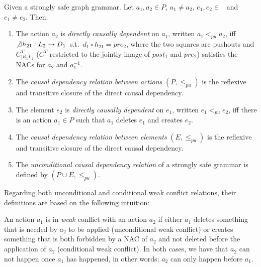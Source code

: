 \begin{definition} Given \doublyTypedGraphGrammarCore{} a strongly safe graph grammar. Let $a_1, a_2 \in P$, $a_1 \ne a_2$, \mbox{$e_1, e_2 \in $ \coreGraph{}} and $e_1 \ne e_2$. Then: 

  \begin{enumerate}
    \item The action $a_2$ is \emph{directly causally dependent} on $a_1$, written $a_1 <_{pu} a_2$, iff \mbox{$\not\exists h_{21} : L_2 \rightarrow D_1$ s.t. \mbox{$d_1 \circ h_{21} = pre_2$}}, where the two squares are pushouts and $C^T_{|R_1L_2}$ ($C^T$ restricted to the jointly-image of $post_1$ and $pre_2$) satisfies the NACs for $a_2$ and $a_1^{-1}$.


   \item The \emph{causal dependency relation between actions} $(P, \leq_{pu})$ is the reflexive and transitive closure of the direct causal dependency.
   \item The element $e_2$ is \emph{directly causally dependent} on $e_1$, written $e_1 <_{pu} e_2$, iff there is an action $a_1 \in P$ such that $a_1$ deletes $e_1$ and creates $e_2$.
   \item The \emph{causal dependency relation between elements} $(E, \leq_{pu})$ is the reflexive and transitive closure of the direct causal dependency.
   \item The \emph{unconditional causal dependency relation} of a strongly safe grammar is defined by $(P \cup E, \leq_{pu})$.
  \end{enumerate}
\end{definition}


Regarding both unconditional and conditional weak conflict relations, their definitions are based on the following intuition:

\begin{intuition} An action $a_1$ is in \emph{weak} conflict with an action $a_2$ if either $a_1$ deletes something that is needed by $a_2$ to be applied (unconditional weak conflict) or creates something that is both forbidden by a NAC of $a_2$ and not deleted before the application of $a_2$ (conditional weak conflict). In both cases, we have that $a_2$ can not happen once $a_1$ has happened, in other words: $a_2$ can only happen before $a_1$.
\end{intuition}


